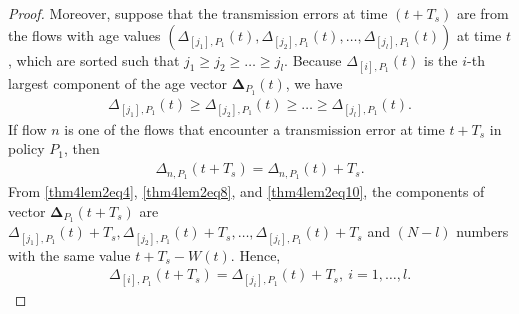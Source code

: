 \begin{proof}
Moreover, suppose that the transmission errors at time $(t+T_s)$ are from the flows with age values $(\Delta_{[j_1],P_1}(t),\Delta_{[j_2],P_1}(t),\ldots,\Delta_{[j_{l}],P_1}(t))$ at time $t$, which are sorted such that $j_1\geq j_2\geq \ldots \geq j_l$. Because $\Delta_{[i],P_1}(t)$ is the $i$-th largest component of the age vector $\bm\Delta_{P_1}(t)$, we have
\begin{align}
 \Delta_{[j_1],P_1}(t) \geq \Delta_{[j_2],P_1}(t)\geq\ldots\geq\Delta_{[j_{l}],P_1}(t). \label{thm4lem2eq8}
\end{align} 
If flow $n$ is one of the flows that encounter a transmission error at time $t+T_s$ in policy $P_1$, then
\begin{align}
\Delta_{n,P_1}(t+T_s) = \Delta_{n,P_1}(t) +T_s. \label{thm4lem2eq10}
\end{align}
From \eqref{thm4lem2eq4}, \eqref{thm4lem2eq8}, and \eqref{thm4lem2eq10}, the components of vector $\bm\Delta_{P_1}(t+T_s)$
are $\Delta_{[j_1],P_1}(t)+T_s,\Delta_{[j_2],P_1}(t)+T_s,\ldots,\Delta_{[j_{l}],P_1}(t)+T_s$ and $(N-l)$ numbers with the same value $t + T_s- W(t)$. Hence,
\begin{align}
\Delta_{[i],P_1}(t+T_s) = \Delta_{[j_i],P_1}(t) +T_s, ~i=1,\ldots,l. \label{thm4lem2eq5}
\end{align}


\end{proof}
